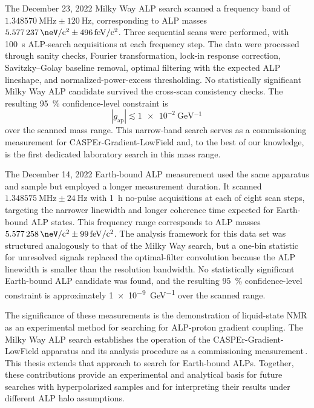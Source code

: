 The December 23, 2022 Milky Way ALP search scanned a frequency band of $\SI{1.348570}{\MHz}\pm \SI{120}{\Hz}$, corresponding to ALP masses
$\SI{5.577237}{\neV/c^2}\pm\SI{496}{\femto\eV/c^2}$.
Three sequential scans were performed, with \SI{100}{\s} ALP-search acquisitions at each frequency step.
The data were processed through sanity checks, Fourier transformation, lock-in response correction, Savitzky--Golay baseline removal, optimal filtering with the expected ALP lineshape, and normalized-power-excess thresholding. 
No statistically significant Milky Way ALP candidate survived the cross-scan consistency checks.
The resulting \SI{95}{\percent} confidence-level constraint is
\begin{equation}
    |g_\mathrm{ap}| \lesssim \SI{1e-2}{\GeV^{-1}}
    \,
\end{equation}
over the scanned mass range.
This narrow-band search serves as a commissioning measurement for CASPEr-Gradient-LowField and, to the best of our knowledge, is the first dedicated laboratory search in this mass range.

The December 14, 2022 Earth-bound ALP measurement used the same apparatus and sample but employed a longer measurement duration.
It scanned $\SI{1.348575}{\MHz}\pm\SI{24}{\Hz}$ with \SI{1}{\hour} no-pulse acquisitions at each of eight scan steps, targeting the narrower linewidth and longer coherence time expected for Earth-bound ALP states.
This frequency range corresponds to ALP masses $\SI{5.577258}{\neV/c^2}\pm\SI{99}{\femto\eV/c^2}$.
The analysis framework for this data set was structured analogously to that of the Milky Way search, but a one-bin statistic for unresolved signals replaced the optimal-filter convolution because the ALP linewidth is smaller than the resolution bandwidth.
No statistically significant Earth-bound ALP candidate was found, and the resulting \SI{95}{\percent} confidence-level constraint is approximately \SI{1e-9}{\GeV^{-1}} over the scanned range. 

The significance of these measurements is the demonstration of liquid-state NMR as an experimental method for searching for ALP-proton gradient coupling.
The Milky Way ALP search establishes the operation of the CASPEr-Gradient-LowField apparatus and its analysis procedure as a commissioning measurement\,\cite{Walter2025_CASPErLFthermal}.
This thesis extends that approach to search for Earth-bound ALPs.
Together, these contributions provide an experimental and analytical basis for future searches with hyperpolarized samples and for interpreting their results under different ALP halo assumptions.

